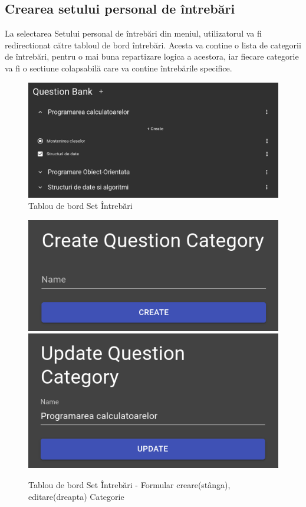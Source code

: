 \documentclass[12pt, a4paper, oneside, romanian]{teza-upb}
\begin{document}
\subsection{Crearea setului personal de întrebări}

La selectarea Setului personal de întrebări din meniul, utilizatorul va fi redirectionat către tabloul de bord întrebări. Acesta va contine o lista de categorii de întrebări, pentru o mai buna repartizare logica a acestora, iar fiecare categorie va fi o sectiune colapsabilă care va contine întrebările specifice.

\begin{figure}[H]
\centering
\includegraphics*[width=\columnwidth]{tablou-de-bord-set-intrebari}
\caption{Tablou de bord Set Întrebări}
\label{tablou-de-bord-set-intrebari}
\end{figure}

\begin{figure}[H]
\centering
\includegraphics*[width=0.45\columnwidth]{tablou-de-bord-set-intrebari-creare-categorie}
\includegraphics*[width=0.45\columnwidth]{tablou-de-bord-set-intrebari-editare-categorie}
\caption{Tablou de bord Set Întrebări - Formular creare(stânga), editare(dreapta) Categorie}
\label{tablou-de-bord-set-intrebari-categorie}
\end{figure}
\end{document}
